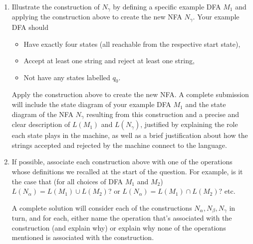 \begin{enumerate}[wide, labelwidth=!, labelindent=0pt]
\begin{enumerate}
\item\gradeCorrect 
Illustrate the construction of $N_{\gamma}$ by defining a specific
example DFA $M_1$  and applying the 
construction above to create the new NFA $N_\gamma$. Your example DFA should
\begin{itemize}
    \item Have exactly four states (all reachable from the respective start state),
    \item Accept at least one string and reject at least one string, 
    \item Not have any states labelled $q_0$.
\end{itemize}
Apply the construction above to create the new NFA. A complete submission 
will include the state diagram of your example DFA $M_1$ and the state diagram of the NFA $N_\gamma$ resulting 
from this construction and a precise and clear description of $L(M_1)$ and $L(N_{\gamma})$, justified
by explaining the role each state plays in the machine, as well as a brief 
justification about how the strings accepted and rejected by the machine connect to the language.

\item \gradeComplete If possible, associate each construction above with one of the operations whose definitions we recalled at the start of the question.  For example, is it the case that (for all choices of DFA $M_1$ and $M_2$) $L(N_\alpha) = L(M_1) \cup L(M_2)$? or $L(N_\alpha) = L(M_1) \cap L(M_2)$? etc.

A complete solution will consider each of the constructions $N_\alpha, N_\beta, N_\gamma$ in turn, and for each, either name the operation that's associated with the construction (and explain why) or explain why none of the operations mentioned is associated with the construction.
\end{enumerate}

\end{enumerate}
\newpage

